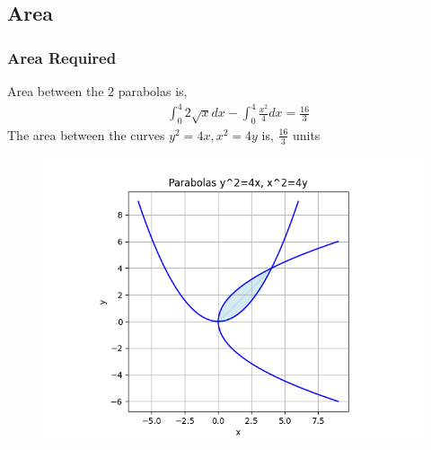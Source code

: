 \documentclass{beamer}
\theoremstyle{remark}
\numberwithin{equation}{section}
\begin{document}
		\subsection{Area}
		\begin{frame}[fragile]
			\frametitle{Area Required}
			Area between the 2 parabolas is,
			\begin{align}
				&\int_0^4 2\sqrt{x}dx- \int_0^4 \frac{x^2}{4}dx = \frac{16}{3}
			\end{align}
			The area between the curves $y^2=4x, x^2=4y$ is, $\frac{16}{3}$ units
			\begin{figure}[h!]
				\centering
				\includegraphics[scale=0.4]{figs/fig.png}
				\label{stemplot}
			\end{figure}
		\end{frame}
\end{document}
